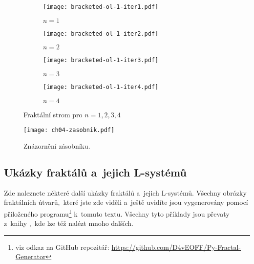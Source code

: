 \begin{figure}[H]
    \centering
    \begin{subfigure}{0.3\textwidth}
        \centering
        \texttt{[image: bracketed-ol-1-iter1.pdf]}
        \begin{center}
            $n=1$
        \end{center}
    \end{subfigure}
    \begin{subfigure}{0.3\textwidth}
        \centering
        \texttt{[image: bracketed-ol-1-iter2.pdf]}
        \begin{center}
            $n=2$
        \end{center}
    \end{subfigure}
    \begin{subfigure}{0.3\textwidth}
        \centering
        \texttt{[image: bracketed-ol-1-iter3.pdf]}
        \begin{center}
            $n=3$
        \end{center}
    \end{subfigure}
    \begin{subfigure}{0.6\textwidth}
        \centering
        \texttt{[image: bracketed-ol-1-iter4.pdf]}
        \begin{center}
            $n=4$
        \end{center}
    \end{subfigure}
    \caption{Fraktální strom pro $n=1,2,3,4$}
    \label{fig:fraktalni-strom}
\end{figure}
\begin{figure}[H]
    \centering
    \texttt{[image: ch04-zasobnik.pdf]}
    \caption{Znázornění zásobníku.}
    \label{fig:zasobnik}
\end{figure}

\subsection{Ukázky fraktálů a~jejich L-systémů}\label{subsec:ukazky-fraktalu-lsystemy}

Zde naleznete některé další ukázky fraktálů a~jejich L-systémů. Všechny obrázky fraktálních útvarů,~které jste zde viděli a~ještě uvidíte jsou vygenerovány pomocí přiloženého programu\footnote{viz odkaz na GitHub repozitář: \url{https://github.com/D4vEOFF/Py-Fractal-Generator}} k~tomuto textu. Všechny tyto příklady jsou převaty z~knihy \cite{Prusinkiewicz1990},~kde lze též nalézt mnoho dalších.

